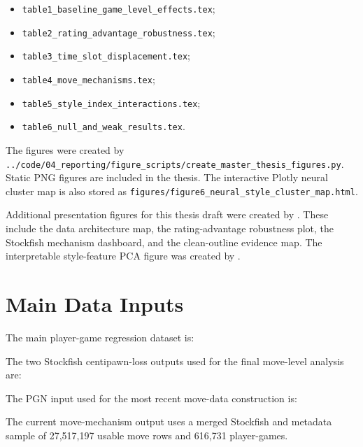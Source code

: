 \begin{itemize}
    \item \texttt{table1\_baseline\_game\_level\_effects.tex};
    \item \texttt{table2\_rating\_advantage\_robustness.tex};
    \item \texttt{table3\_time\_slot\_displacement.tex};
    \item \texttt{table4\_move\_mechanisms.tex};
    \item \texttt{table5\_style\_index\_interactions.tex};
    \item \texttt{table6\_null\_and\_weak\_results.tex}.
\end{itemize}

The figures were created by \texttt{../code/04\_reporting/figure\_scripts/create\_master\_thesis\_figures.py}. Static PNG figures are included in the thesis. The interactive Plotly neural cluster map is also stored as \texttt{figures/figure6\_neural\_style\_cluster\_map.html}.

Additional presentation figures for this thesis draft were created by . These include the data architecture map, the rating-advantage robustness plot, the Stockfish mechanism dashboard, and the clean-outline evidence map. The interpretable style-feature PCA figure was created by .

\section{Main Data Inputs}

The main player-game regression dataset is:

\begin{quote}
\end{quote}

The two Stockfish centipawn-loss outputs used for the final move-level analysis are:

\begin{quote}
\end{quote}

\begin{quote}
\end{quote}

The PGN input used for the most recent move-data construction is:

\begin{quote}
\end{quote}

The current move-mechanism output uses a merged Stockfish and metadata sample of 27,517,197 usable move rows and 616,731 player-games.

